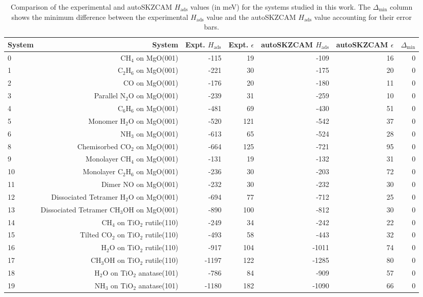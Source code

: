 \begin{table}
\caption{\label{tab:hads_comparison}Comparison of the experimental and autoSKZCAM $H_\textrm{ads}$ values (in meV) for the systems studied in this work. The $\Delta_\textrm{min}$ column shows the minimum difference between the experimental $H_\textrm{ads}$ value and the autoSKZCAM $H_\textrm{ads}$ value accounting for their error bars.}
\begin{adjustbox}{center,max width=0.9\textwidth}
\begin{tabular}{lrrrrrr}
\toprule
System & System & Expt. $H_\textrm{ads}$ & Expt. $\epsilon$ & autoSKZCAM $H_\textrm{ads}$ & autoSKZCAM $\epsilon$ & $\Delta_\textrm{min}$ \\ 
\midrule
0 & CH$_4$ on MgO(001) & -115 & 19 & -109 & 16 & 0 \\
1 & C$_2$H$_6$ on MgO(001) & -221 & 30 & -175 & 20 & 0 \\
2 & CO on MgO(001) & -176 & 20 & -180 & 11 & 0 \\
3 & Parallel N$_2$O on MgO(001) & -239 & 31 & -259 & 10 & 0 \\
4 & C$_6$H$_6$ on MgO(001) & -481 & 69 & -430 & 51 & 0 \\
5 & Monomer H$_2$O on MgO(001) & -520 & 121 & -542 & 37 & 0 \\
6 & NH$_3$ on MgO(001) & -613 & 65 & -524 & 28 & 0 \\
8 & Chemisorbed CO$_2$ on MgO(001) & -664 & 125 & -721 & 95 & 0 \\
9 & Monolayer CH$_4$ on MgO(001) & -131 & 19 & -132 & 31 & 0 \\
10 & Monolayer C$_2$H$_6$ on MgO(001) & -236 & 30 & -203 & 72 & 0 \\
11 & Dimer NO on MgO(001) & -232 & 30 & -232 & 30 & 0 \\
12 & Dissociated Tetramer H$_2$O on MgO(001) & -694 & 77 & -712 & 25 & 0 \\
13 & Dissociated Tetramer CH$_3$OH on MgO(001) & -890 & 100 & -812 & 30 & 0 \\
14 & CH$_4$ on TiO$_2$ rutile(110) & -249 & 34 & -242 & 22 & 0 \\
15 & Tilted CO$_2$ on TiO$_2$ rutile(110) & -493 & 58 & -443 & 32 & 0 \\
16 & H$_2$O on TiO$_2$ rutile(110) & -917 & 104 & -1011 & 74 & 0 \\
17 & CH$_3$OH on TiO$_2$ rutile(110) & -1197 & 122 & -1285 & 80 & 0 \\
18 & H$_2$O on TiO$_2$ anatase(101) & -786 & 84 & -909 & 57 & 0 \\
19 & NH$_3$ on TiO$_2$ anatase(101) & -1180 & 182 & -1090 & 66 & 0 \\
\bottomrule
\end{tabular}
\end{adjustbox}
\end{table}